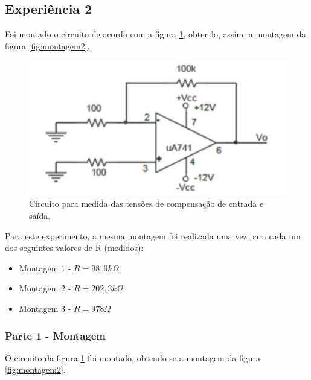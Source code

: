 \documentclass{abntex2}
\begin{document}
\clearpage

\subsection{Experiência 2}

Foi montado o circuito de acordo com a figura \ref{fig:circuito2}, obtendo, assim, a montagem da figura \ref{fig:montagem2}.

\begin{figure}[h]
  \centering
  \includegraphics[scale = 0.5]{exp2.png}
  \caption{Circuito para medida das tensões de compensação de entrada e saída.}
  \label{fig:circuito2}
\end{figure}

Para este experimento, a mesma montagem foi realizada uma vez para cada um dos seguintes valores de R (medidos):
\begin{itemize}
  \item Montagem 1 - $R = 98,9k\Omega$
  \item Montagem 2 - $R = 202,3k\Omega$
  \item Montagem 3 - $R = 978\Omega$
\end{itemize}

\subsubsection{Parte 1 - Montagem}

O circuito da figura \ref{fig:circuito2} foi montado, obtendo-se a montagem da figura \ref{fig:montagem2}.
\end{document}
